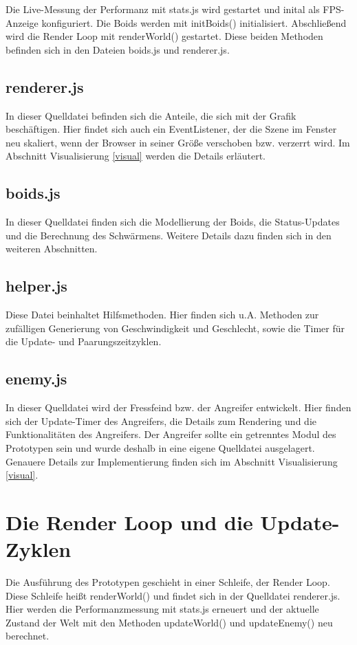 \documentclass[draft=false
              ,paper=a4
              ,twoside=false
              ,fontsize=11pt
              ,headsepline
              ,BCOR10mm
              ,DIV11
              ,bibtotoc
              ,liststotoc
              ]{scrbook}
\begin{document}
Die Live-Messung der Performanz mit stats.js wird gestartet und inital als FPS-Anzeige konfiguriert.
Die Boids werden mit initBoids() initialisiert. Abschließend wird die Render Loop mit renderWorld() gestartet. Diese beiden Methoden befinden sich in den Dateien boids.js und renderer.js.
\subsection{renderer.js}
In dieser Quelldatei befinden sich die Anteile, die sich mit der Grafik beschäftigen. Hier findet sich auch ein EventListener, der die Szene im Fenster neu skaliert, wenn der Browser in seiner Größe verschoben bzw. verzerrt wird. Im Abschnitt Visualisierung \ref{visual} werden die Details erläutert.
\subsection{boids.js}
In dieser Quelldatei finden sich die Modellierung der Boids, die Status-Updates und die Berechnung des Schwärmens. Weitere Details dazu finden sich in den weiteren Abschnitten.
\subsection{helper.js}
Diese Datei beinhaltet Hilfsmethoden. Hier finden sich u.A. Methoden zur zufälligen Generierung von Geschwindigkeit und Geschlecht, sowie die Timer für die Update- und Paarungszeitzyklen.
\subsection{enemy.js}
In dieser Quelldatei wird der Fressfeind bzw. der Angreifer entwickelt. Hier finden sich der Update-Timer des Angreifers, die Details zum Rendering und die Funktionalitäten des Angreifers. Der Angreifer sollte ein getrenntes Modul des Prototypen sein und wurde deshalb in eine eigene Quelldatei ausgelagert. Genauere Details zur Implementierung finden sich im Abschnitt Visualisierung \ref{visual}.

\section{Die Render Loop und die Update-Zyklen}
Die Ausführung des Prototypen geschieht in einer Schleife, der Render Loop. Diese Schleife heißt renderWorld() und findet sich in der Quelldatei renderer.js. Hier werden die Performanzmessung mit stats.js erneuert und der aktuelle Zustand der Welt mit den Methoden updateWorld() und updateEnemy() neu berechnet.
\end{document}
